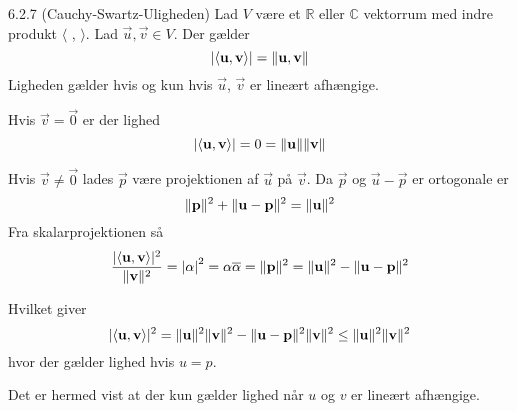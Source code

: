 %
%

\begin{saetning}{6.2.7 (Cauchy-Swartz-Uligheden)}
	Lad $V$ være et $\mathbb{R}$ eller $\mathbb{C}$ vektorrum med indre produkt
	$\langle$ , $\rangle$. Lad $\vec{u}, \vec{v} \in V$. Der gælder
	\[
		\lvert \langle \mathbf{u}, \mathbf{v} \rangle \rvert = \lVert\mathbf{u},
		\mathbf{v}\rVert
	\]
	Ligheden gælder hvis og kun hvis $\vec{u}$, $\vec{v}$ er lineært afhængige.
\end{saetning}

\begin{bevis}
	Hvis $\vec{v}=\vec{0}$ er der lighed
	\[
		\lvert \langle \mathbf{u}, \mathbf{v} \rangle \rvert = 0 = \lVert\mathbf{u}\rVert
		\lVert\mathbf{v}\rVert
	\]
	
	\noindent Hvis $\vec{v} \not= \vec{0}$ lades $\vec{p}$ være projektionen af $\vec{u}$
	på $\vec{v}$. Da $\vec{p}$ og $\vec{u} - \vec{p}$ er ortogonale er
	\[
		\lVert\mathbf{p}\rVert^2 + \lVert\mathbf{u} - \mathbf{p}\rVert^2 = \lVert\mathbf{u}\rVert^2
	\]
	Fra skalarprojektionen så
	\[
		\frac{\lvert \langle \mathbf{u}, \mathbf{v} \rangle \rvert^2}{\lVert\mathbf{v}\rVert^2}
		= {\lvert \alpha \rvert}^2 = \alpha \overline\alpha = \lVert\mathbf{p}\rVert^2
		= \lVert\mathbf{u}\rVert^2 - \lVert\mathbf{u} - \mathbf{p}\rVert^2
	\]
	\begin{center}
	\end{center}
	Hvilket giver
	\[
		\lvert \langle \mathbf{u}, \mathbf{v} \rangle \rvert^2 = \lVert\mathbf{u}\rVert^2
		\lVert\mathbf{v}\rVert^2 - \lVert\mathbf{u} - \mathbf{p}\rVert^2\lVert\mathbf{v}\rVert^2 \leq
		\lVert\mathbf{u}\rVert^2\lVert\mathbf{v}\rVert^2
	\]
	hvor der gælder lighed hvis $u=p$.

	Det er hermed vist at der kun gælder lighed når $u$ og $v$ er lineært
	afhængige.
\end{bevis}
